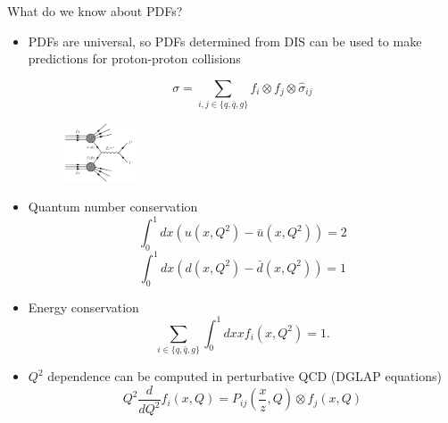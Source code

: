 \documentclass[8pt,t]{beamer}
\begin{document}
\begin{frame}{What do we know about PDFs?}

    \begin{itemize}
      \item PDFs are universal, so PDFs determined from DIS can be used to make predictions for proton-proton collisions

        \begin{equation*}
          \sigma=\sum_{i, j \in \{q,\bar{q},g\}} f_i \otimes f_j \otimes \hat{\sigma}_{i j}
        \end{equation*}

        \begin{figure}
          \includegraphics[width=0.2\textwidth]{dy_schematic.png}
        \end{figure}

      \item Quantum number conservation
        \begin{equation*}
          \int_0^1 d x\left(u\left(x, Q^2\right)-\bar{u}\left(x, Q^2\right)\right)=2
        \end{equation*}
        \begin{equation*}
          \int_0^1 d x\left(d\left(x, Q^2\right)-\bar{d}\left(x, Q^2\right)\right)=1
        \end{equation*}

        \item Energy conservation
          \begin{equation*}
            \sum_{i\in \{q, \bar{q}, g\}} \int_0^1 d x x f_i\left(x, Q^2\right)=1 .
          \end{equation*}

      \item $Q^2$ dependence can be computed in perturbative QCD (DGLAP equations)
        \begin{equation*}
          Q^2 \frac{d}{d Q^2} f_i(x, Q)=P_{i j}\left(\frac{x}{z}, Q\right) \otimes f_j(x, Q)
        \end{equation*}

    \end{itemize}


\end{frame}
\end{document}
